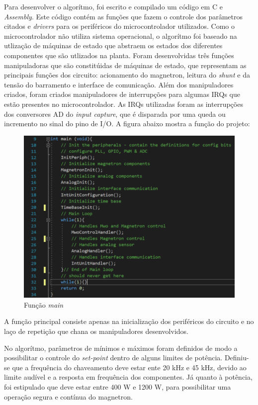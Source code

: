 Para desenvolver o algorítmo, foi escrito e compilado um código em C e \textit{Assembly}. Este código contém as funções que fazem o controle dos parâmetros citados e \textit{drivers} para os periféricos do microcontrolador utilizados. Como o microcontrolador não utiliza sistema operacional, o algorítmo foi baseado na utlização de máquinas de estado que abstraem os estados dos diferentes componentes que são utlizados na planta. Foram desenvolvidas três funções manipuladoras que são constitúidas de máquinas de estado, que representam as principais funções dos circuito: acionamento do magnetron, leitura do \textit{shunt} e da tensão do barramento e interface de comunicação. Além dos manipuladores criados, foram criados manipuladores de interrupções para algumas IRQs que estão presentes no microcontrolador. As IRQs utilizadas foram as interrupções dos conversores AD do \textit{input capture}, que é disparada por uma queda ou incremento no sinal do pino de I/O. A figura abaixo mostra a função  do projeto:

\begin{figure}[H]
    \centering
    \includegraphics[width=1\textwidth]{./dados/figuras/func_main}
    \caption{Função \textit{main}}
    \label{fig:figura-magnetron-usado}
\end{figure}

A função principal consiste apenas na inicialização dos periféricos do circuito e no laço de repetição que chana os manipuladores desenvolvidos.

No algorítmo, parâmetros de mínimos e máximos foram definidos de modo a possibilitar o controle do \textit{set-point} dentro de alguns limites de potência. Definiu-se que a frequência do chaveamento deve estar ente 20 kHz e 45 kHz, devido ao limite audível e a resposta em frequência dos componentes. Já quanto à potência, foi estipulado que deve estar entre 400 W e 1200 W, para possibilitar uma operação segura e contínua do magnetron.

